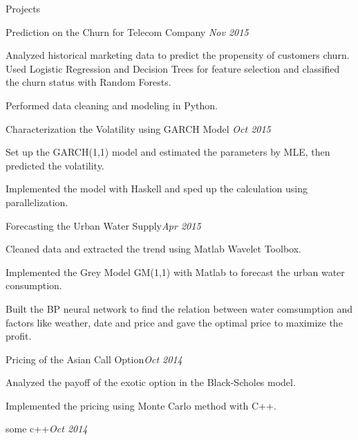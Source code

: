 \documentclass{resume} %
\begin{document}
\begin{rSection}{Projects}

\begin{rSubsection}{Prediction on the Churn for Telecom Company }{\em Nov 2015}{}{}
\item Analyzed historical marketing data to predict the propensity of customers churn. Used Logistic Regression and Decision Trees for feature selection and classified the churn status with Random Forests.
\item Performed data cleaning and modeling in Python.


\end{rSubsection}

\begin{rSubsection}{Characterization the Volatility using GARCH Model}{ \em Oct 2015}{}{}
\item Set up the GARCH(1,1) model and estimated the parameters by MLE, then predicted the volatility.
\item Implemented the model with Haskell and sped up the calculation using parallelization.
\end{rSubsection}

\begin{rSubsection}{Forecasting the Urban Water Supply}{\em Apr 2015}{}{}
\item Cleaned data and extracted the trend using Matlab Wavelet Toolbox.
\item Implemented the Grey Model GM(1,1) with Matlab to forecast the urban water consumption.
\item Built the BP neural network to find the relation between water comsumption and factors like weather, date and price and gave the optimal price to maximize the profit.

\end{rSubsection}
\begin{rSubsection}{Pricing of the Asian Call Option}{\em Oct 2014}{}{}
\item Analyzed the payoff of the exotic option in the Black-Scholes model.
\item Implemented the pricing using Monte Carlo method with C++.
\end{rSubsection}

\begin{rSubsection}{some c++}{\em Oct 2014}{}{}
\item 
\item 
\end{rSubsection}

\end{rSection}
\end{document}
